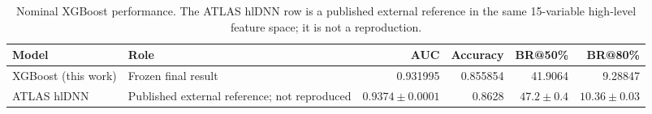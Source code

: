 \begin{table}[tbp]
\centering
\caption{Nominal XGBoost performance. The ATLAS hlDNN row is a published external reference in the same 15-variable high-level feature space; it is not a reproduction.}
\label{tab:nominal-performance}
\begin{tabular}{llrrrr}
\toprule
Model & Role & AUC & Accuracy & BR@50\% & BR@80\% \\
\midrule
XGBoost (this work) & Frozen final result & 0.931995 & 0.855854 & 41.9064 & 9.28847 \\
ATLAS hlDNN & Published external reference; not reproduced & $0.9374 \pm 0.0001$ & 0.8628 & $47.2 \pm 0.4$ & $10.36 \pm 0.03$ \\
\bottomrule
\end{tabular}
\end{table}
